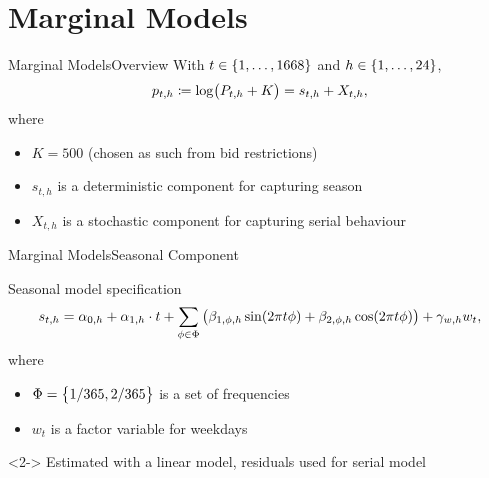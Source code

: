 \section{Marginal Models}
\label{sec:marginal}

\begin{frame}{Marginal Models}{Overview}
  With \(t \in \cbr{1,\dotsc,1668}\) and \(h \in \cbr{1,\dotsc,24}\),
  \begin{equation*}
    p_{t,h} \coloneqq \log\of{P_{t,h} + K} = s_{t,h} + X_{t,h},
  \end{equation*}
  where
  \begin{itemize}
  \item \(K = 500\) (chosen as such from bid restrictions)
  \item \(s_{t,h}\) is a deterministic component for capturing season
  \item \(X_{t,h}\) is a stochastic component for capturing serial behaviour
  \end{itemize}
\end{frame}

\begin{frame}{Marginal Models}{Seasonal Component}
  \begin{block}{Seasonal model specification}
    \begin{equation*}
      s_{t,h} = \alpha_{0,h} + \alpha_{1,h} \cdot t + \sum_{\phi \in \Phi} \del{\beta_{1,\phi,h} \sin\of{2\pi t \phi} + \beta_{2,\phi,h} \cos\of{2\pi t \phi}} + \gamma_{w,h} w_{t} ,
    \end{equation*}
    where
    \begin{itemize}
    \item \(\Phi = \cbr{1/365, 2/365}\) is a set of frequencies
    \item \(w_{t}\) is a factor variable for weekdays
    \end{itemize}
  \end{block}
  \begin{block}{}<2->
    Estimated with a linear model, residuals used for serial model
  \end{block}
\end{frame}


